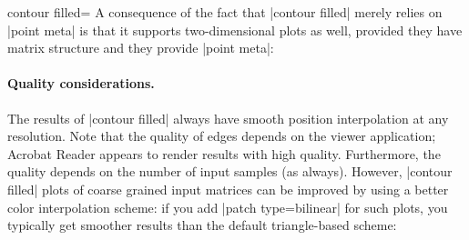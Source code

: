 {{\begin{plottype}[/pgfplots]{
    contour filled=\textcolor{black}{}%
}
    A consequence of the fact that |contour filled| merely relies on
    |point meta| is that it supports two-dimensional plots as well, provided
    they have matrix structure and they provide |point meta|:
\begin{codeexample}[]
\end{codeexample}

\begin{codeexample}[]
\end{codeexample}


    \paragraph{Quality considerations.}

    The results of |contour filled| always have smooth position interpolation
    at any resolution. Note that the quality of edges depends on the viewer
    application; Acrobat Reader appears to render results with high quality.
    Furthermore, the quality depends on the number of input samples (as
    always). However, |contour filled| plots of coarse grained input matrices
    can be improved by using a better color interpolation scheme: if you add
    |patch type=bilinear| for such plots, you typically get smoother results
    than the default triangle-based scheme:
\begin{codeexample}[]
\end{codeexample}
\end{plottype}}}
